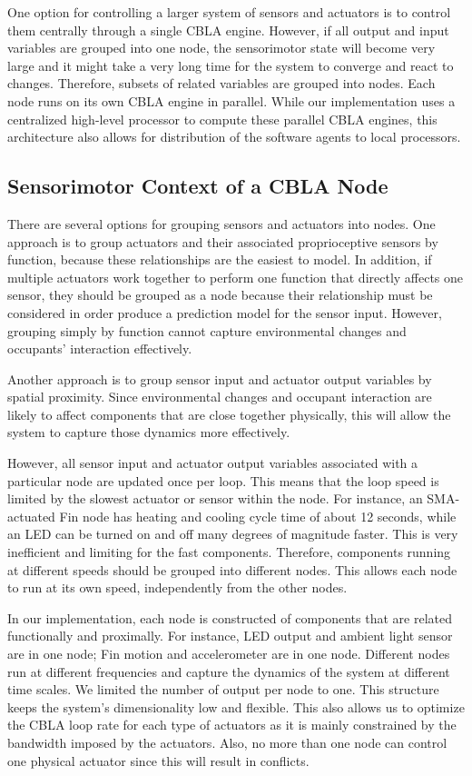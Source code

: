 One option for controlling a larger system of sensors and actuators is to control them centrally through a single CBLA engine.  However, if all output and input variables are grouped into one node, the sensorimotor state will become very large and it might take a very long time for the system to converge and react to changes. Therefore, subsets of related variables are grouped into nodes. Each node runs on its own CBLA engine in parallel.  While our implementation uses a centralized high-level processor to compute these parallel CBLA engines, this architecture also allows for distribution of the software agents to local processors.

\subsection{Sensorimotor Context of a CBLA Node}

There are several options for grouping sensors and actuators into nodes.  One approach is to group actuators and their associated proprioceptive sensors by function, because these relationships are the easiest to model. In addition, if multiple actuators work together to perform one function that directly affects one sensor, they should be grouped as a node because their relationship must be considered in order produce a prediction model for the sensor input. However, grouping simply by function cannot capture environmental changes and occupants' interaction effectively. 

Another approach is to group sensor input and actuator output variables by spatial proximity. Since environmental changes and occupant interaction are likely to affect components that are close together physically, this will allow the system to capture those dynamics more effectively. 

However, all sensor input and actuator output variables associated with a particular node are updated once per loop. This means that the loop speed is limited by the slowest actuator or sensor within the node. For instance, an SMA-actuated Fin node has heating and cooling cycle time of about 12 seconds, while an LED can be turned on and off many degrees of magnitude faster. This is very inefficient and limiting for the fast components. Therefore, components running at different speeds should be grouped into different nodes. This allows each node to run at its own speed, independently from the other nodes. 

In our implementation, each node is constructed of components that are related functionally and proximally. For instance, LED output and ambient light sensor are in one node; Fin motion and accelerometer are in one node. Different nodes run at different frequencies and capture the dynamics of the system at different time scales. We limited the number of output per node to one. This structure keeps the system's dimensionality low and flexible. This also allows us to optimize the CBLA loop rate for each type of actuators as it is mainly constrained by the bandwidth imposed by the actuators. Also, no more than one node can control one physical actuator since this will result in conflicts. 

